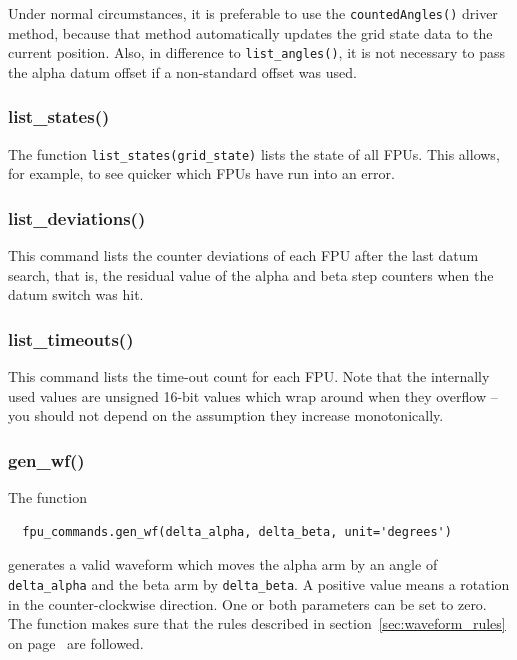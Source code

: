 \documentclass[11pt,a4paper]{scrartcl}
\begin{document}
Under normal circumstances, it is preferable to use the
\texttt{countedAngles()} driver method, because that method
automatically updates the grid state data to the current position.
Also, in difference to \texttt{list\_angles()}, it is not necessary
  to pass the alpha datum offset if a non-standard offset was used.

\subsubsection{list\_states()}
\label{sec:liststates}

The function \texttt{list\_states(grid\_state)} lists the state of all
FPUs. This allows, for example, to see quicker which FPUs have run into an error.

\subsubsection{list\_deviations()}
This command lists the counter deviations of each FPU after the last
datum search, that is, the residual value of the alpha and beta step
counters when the datum switch was hit.

\subsubsection{list\_timeouts()}
 This command lists the time-out count for
each FPU. Note that the internally used values are unsigned 16-bit
values which wrap around when they overflow -- you should not depend
on the assumption they increase monotonically.


\subsubsection{gen\_wf()}
\label{sec:genwf}


The function
\begin{verbatim}
  fpu_commands.gen_wf(delta_alpha, delta_beta, unit='degrees')
\end{verbatim}
generates a valid waveform which moves the alpha arm
by an angle of \texttt{delta\_alpha} and the beta arm by
\texttt{delta\_beta}. A positive value means a rotation in the
counter-clockwise direction.  One or both parameters can be set to
zero. The function makes sure that the rules described in
section~\ref{sec:waveform_rules} on page~\pageref{sec:waveform_rules}
are followed.
\end{document}
